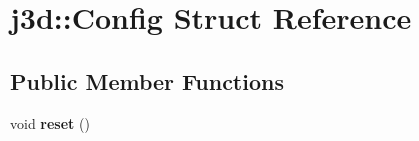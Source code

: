\hypertarget{structj3d_1_1Config}{}\section{j3d\+:\+:Config Struct Reference}
\label{structj3d_1_1Config}
\subsection*{Public Member Functions}
\begin{DoxyCompactItemize}
\item 
\hypertarget{structj3d_1_1Config_ad6a6a5aea25774288fbc964e69c10479}{}void {\bfseries reset} ()\label{structj3d_1_1Config_ad6a6a5aea25774288fbc964e69c10479}

\end{DoxyCompactItemize}
